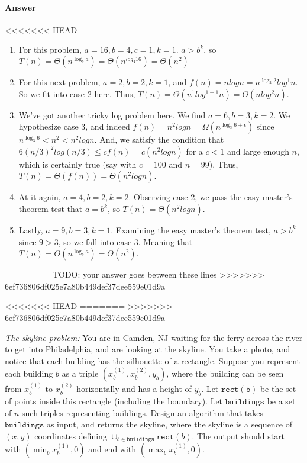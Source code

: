 \documentclass{article}
\begin{document}
\paragraph{Answer}


<<<<<<< HEAD
\begin{enumerate}
	\item
		For this problem, $a=16, b=4, c=1, k=1$. $a>b^k$, so $T(n)=
		\Theta(n^{\log_{b} a}) = \Theta(n^{log_{4} 16}) = \Theta(n^2)$
	\item
		For this next problem, $a=2, b= 2, k=1$, and $f(n) = nlogn = 
		n^{\log_{2} 2}log^1n$. So we fit into case 2 here. 
		Thus, $T(n) = \Theta(n^1log^{1+1}n) =\Theta(nlog^2n)$.
	\item
		We've got another tricky log problem here. We find $a = 6,
		b=3, k = 2$. We hypothesize case 3, and indeed $f(n) = n^2logn
		= \Omega(n^{\log_{3} 6 + \epsilon})$ since $n^{\log_{3} 6 }< 
		n^2 < n^2logn$. And, we satisfy the condition that $6(n/3)^2
		log(n/3) \leq
		cf(n) = c(n^2logn)$ for a $c<1$ and large enough $n$, 
		which is certainly true (say with $c = 100$ and $n = 99$).
		Thus, $T(n) = \Theta(f(n)) = \Theta(n^2logn)$.
	\item
		At it again, $a = 4, b = 2, k = 2$. Observing case 2, we
		pass the easy master's theorem test that $a = b^k$, so
		$T(n) = \Theta(n^2logn)$.
	\item
		Lastly, $a = 9, b = 3, k = 1$. Examining the easy master's
		theorem test, $a > b^k$ since $9 > 3$, so we fall into case 3.
		Meaning that $T(n) = \Theta(n^{\log_{b}a}) = \Theta(n^2)$.
\end{enumerate}
=======
TODO: your answer goes between these lines
>>>>>>> 6ef736806df025e7a80b449def37dee559e01d9a


\nextprob
<<<<<<< HEAD
=======
>>>>>>> 6ef736806df025e7a80b449def37dee559e01d9a

\emph{The skyline problem:} You are in Camden, NJ waiting for the ferry across the river to
get into Philadelphia, and are looking at the skyline.  You take a photo, and notice that each building
has the silhouette of a rectangle.  Suppose you  represent each building $b$ as a
triple $(x_b^{(1)},x_b^{(2)},y_b)$, where the building can be seen from $x_b^{(1)}$ to $x_b^{(2)}$
horizontally and has a height of $y_b$.  Let $\mathtt{rect(b)}$ be the set of
points inside this rectangle (including the boundary).  Let $\mathtt{buildings}$
be a set of $n$ such triples representing buildings. Design an algorithm that takes $\mathtt{buildings}$ as input, and
returns the skyline, where the skyline is a sequence of~$(x,y)$ coordinates
defining $\cup_{b \in \mathtt{buildings}} \mathtt{rect}(b)$.  The output should
start with $(\min_b{x_b^{(1)}},0)$ and end with $(\max_b{x_b^{(1)}},0)$.
\end{document}
